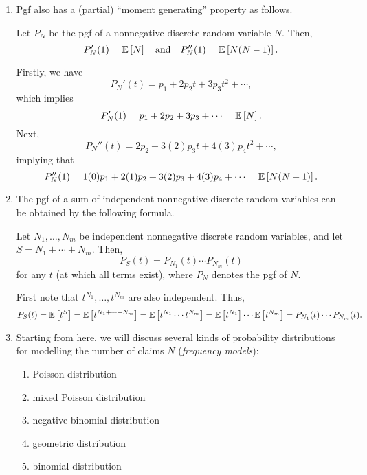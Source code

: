 \begin{enumerate}
\item Pgf also has a (partial) ``moment generating'' property as follows.
\begin{proposition}
\label{prp:pgf-gen-mom}
Let \(P_N\) be the pgf of a nonnegative discrete random variable \(N\).  Then,
\[
P_N'(1)=\expv{N}\qqtext{and}P_N''(1)=\expv{N(N-1)}.
\]
\end{proposition}
\begin{pf}
Firstly, we have
\[
P_N'(t)=p_1+2p_2t+3p_3t^2+\dotsb,
\]
which implies
\[
P_N'(1)=p_1+2p_2+3p_3+\dotsb=\mathbb{E}\left[N\right].
\]
Next,
\[
P_N''(t)=2p_2+3(2)p_3t+4(3)p_4t^2+\dotsb,
\]
implying that
\[
P_N''(1)=1(0)p_1+2(1)p_2+3(2)p_3+4(3)p_4+\dotsb=\mathbb{E}\left[N(N-1)\right].
\]
\end{pf}
\item The pgf of a sum of independent nonnegative discrete random variables can
be obtained by the following formula.
\begin{theorem}
\label{thm:pgf-sum}
Let \(N_1,\dotsc,N_m\) be independent nonnegative discrete random variables,
and let \(S=N_1+\dotsb+N_m\). Then,
\[
P_S(t)=P_{N_1}(t)\dotsb P_{N_m}(t)
\]
for any \(t\) (at which all terms exist), where \(P_N\) denotes the pgf of
\(N\).
\end{theorem}
\begin{pf}
First note that \(t^{N_1},\dotsc,t^{N_m}\) are also independent. Thus,
\[
P_S(t)=\mathbb{E}\left[t^S\right]=\mathbb{E}\left[t^{N_1+\dotsb+N_m}\right]
=\mathbb{E}\left[t^{N_1}\dotsb t^{N_m}\right]
=\mathbb{E}\left[t^{N_1}\right]\dotsb\mathbb{E}\left[t^{N_m}\right]
=P_{N_1}(t)\dotsb P_{N_m}(t).
\]
\end{pf}
\item Starting from here, we will discuss several kinds of probability
distributions for modelling the number of claims \(N\) (\emph{frequency
models}):
\begin{enumerate}
\item Poisson distribution
\item mixed Poisson distribution
\item negative binomial distribution
\item geometric distribution
\item binomial distribution
\end{enumerate}
\end{enumerate}
